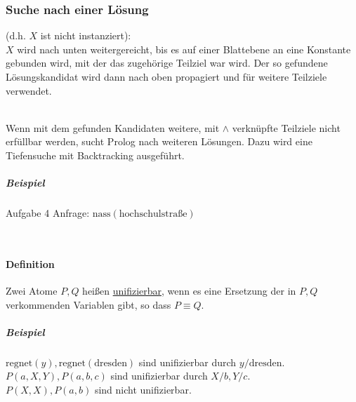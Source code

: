 \documentclass[a4paper]{scrartcl}
\begin{document}
\subsubsection{Suche nach einer Lösung} (d.h. $X$ ist nicht instanziert):\\
$X$ wird nach unten weitergereicht, bis es auf einer Blattebene an eine Konstante gebunden wird, mit der das zugehörige Teilziel war wird. Der so gefundene Lösungskandidat wird dann nach oben propagiert und für weitere Teilziele verwendet.\\
\\
Wenn mit dem gefunden Kandidaten weitere, mit $\wedge$ verknüpfte Teilziele nicht erfüllbar werden, sucht Prolog nach weiteren Lösungen. Dazu wird eine Tiefensuche mit Backtracking ausgeführt.

\subparagraph{Beispiel} Aufgabe 4
Anfrage: $\text{nass}(\text{hochschulstraße})$\\
\\

\paragraph{Definition}
Zwei Atome $P,Q$ heißen \underline{unifizierbar}, wenn es eine Ersetzung der in $P,Q$ verkommenden Variablen gibt, so dass $P \equiv Q$.

\subparagraph{Beispiel} $\text{regnet}(y),\text{regnet}(\text{dresden})$ sind unifizierbar durch $y / \text{dresden}.$\\ $P(a,X,Y),P(a,b,c)$ sind unifizierbar durch $X/b,Y/c.$\\ $P(X,X),P(a,b)$ sind nicht unifizierbar.
\end{document}
